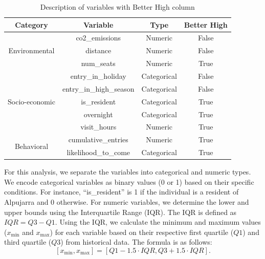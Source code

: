 \documentclass[12pt]{book}
\begin{document}
\begin{table}[h]
\centering
\begin{tabular}{@{}cccc@{}}
\toprule
\textbf{Category}         & \textbf{Variable} & \textbf{Type} & \textbf{Better High} \\ \midrule
\multirow{3}{*}{Environmental} & co2\_emissions & Numeric & False \\
                              & distance & Numeric & False \\
                              & num\_seats & Numeric & True \\ \midrule
\multirow{5}{*}{Socio-economic} & entry\_in\_holiday & Categorical & False \\
                                & entry\_in\_high\_season & Categorical & False \\
                                & is\_resident & Categorical & True \\
                                & overnight & Categorical & True \\
                                & visit\_hours & Numeric & True \\ \midrule
\multirow{2}{*}{Behavioral} & cumulative\_entries & Numeric & True \\ 
                            & likelihood\_to\_come & Categorical & True \\ \bottomrule
\end{tabular}%
\caption{Description of variables with Better High column}
\label{tab:used}
\end{table}


For this analysis, we separate the variables into categorical and numeric types. We encode categorical variables as binary values (0 or 1) based on their specific conditions. For instance, ``is\_resident'' is 1 if the individual is a resident of Alpujarra and 0 otherwise. For numeric variables, we determine the lower and upper bounds using the Interquartile Range (IQR). The IQR is defined as $IQR = Q3 - Q1$. Using the IQR, we calculate the minimum and maximum values ($x_{\min}$ and $x_{\max}$) for each variable based on their respective first quartile ($Q1$) and third quartile ($Q3$) from historical data. The formula is as follows:
\[
[x_{\min}, x_{\max}] = [Q1 - 1.5 \cdot IQR, Q3 + 1.5 \cdot IQR].
\]

\end{document}
